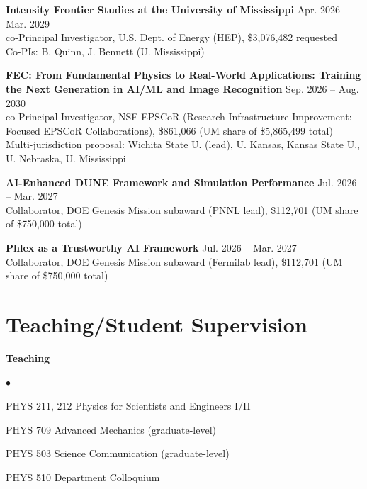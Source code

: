 \documentclass[margin, line]{res}
\newenvironment{list2}{
	\begin{list}{$\bullet$}{%
		\setlength{\itemsep}{0in}
		\setlength{\parsep}{0in} \setlength{\parskip}{0in}
		\setlength{\topsep}{0in} \setlength{\partopsep}{0in}
		\setlength{\leftmargin}{0.2in}}}{\end{list}}
\renewcommand{\em}{\upshape\sffamily}
\begin{document}
\begin{resume}
{\bf Intensity Frontier Studies at the University of Mississippi} \hfill {Apr. 2026 -- Mar. 2029}\\
{\em co-Principal Investigator}, U.S. Dept. of Energy (HEP), \$3,076,482 requested\\
{\em Co-PIs: B. Quinn, J. Bennett (U. Mississippi)}\\
\vspace{-.3cm}

{\bf FEC: From Fundamental Physics to Real-World Applications: Training the Next Generation in AI/ML and Image Recognition} \hfill {Sep. 2026 -- Aug. 2030}\\
{\em co-Principal Investigator}, NSF EPSCoR (Research Infrastructure Improvement: Focused EPSCoR Collaborations), \$861,066 (UM share of \$5,865,499 total)\\
{\em Multi-jurisdiction proposal: Wichita State U. (lead), U. Kansas, Kansas State U., U. Nebraska, U. Mississippi}\\
\vspace{-.3cm}

{\bf AI-Enhanced DUNE Framework and Simulation Performance} \hfill {Jul. 2026 -- Mar. 2027}\\
{\em Collaborator}, DOE Genesis Mission subaward (PNNL lead), \$112,701 (UM share of \$750,000 total)\\
\vspace{-.3cm}

{\bf Phlex as a Trustworthy AI Framework} \hfill {Jul. 2026 -- Mar. 2027}\\
{\em Collaborator}, DOE Genesis Mission subaward (Fermilab lead), \$112,701 (UM share of \$750,000 total)\\
\vspace{-.3cm}

\section{\sc Teaching/Student Supervision}

{\bf Teaching}
\begin{list2}
	\item PHYS 211, 212 Physics for Scientists and Engineers I/II
	\item PHYS 709 Advanced Mechanics (graduate-level)
	\item PHYS 503 Science Communication (graduate-level)
	\item PHYS 510 Department Colloquium
\end{list2}


\end{resume}
\end{document}
